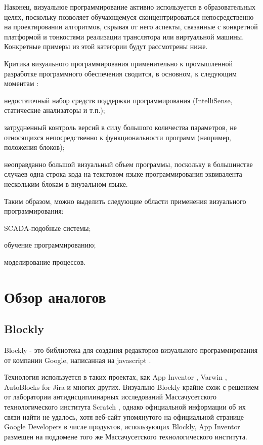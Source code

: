 Наконец, визуальное программирование активно используется в образовательных целях, поскольку позволяет обучающемуся сконцентрироваться непосредственно на проектировании алгоритмов, скрывая от него аспекты, связанные с конкретной платформой и тонкостями реализации транслятора или виртуальной машины. Конкретные примеры из этой категории будут рассмотрены ниже.

Критика визуального программирования применительно к промышленной разработке программного обеспечения сводится, в основном, к следующим моментам \cite{vpl-crit}:

\begin{itemize*}
	\item недостаточный набор средств поддержки программирования (IntelliSense, статические анализаторы и т.п.);
	\item затрудненный контроль версий в силу большого количества параметров, не относящихся непосредственно к функциональности программ (например, положения блоков);
	\item неоправданно большой визуальный объем программы, поскольку в большинстве случаев одна строка кода на текстовом языке программирования эквивалента нескольким блокам в виузальном языке.
\end{itemize*}

Таким образом, можно выделить следующие области применения визуального программирования:

\begin{enumerate*}
	\item SCADA-подобные системы;
	\item обучение программированию;
	\item моделирование процессов.
\end{enumerate*}

\section{Обзор аналогов}
\subsection{Blockly}
Blockly - это библиотека для создания редакторов визуального программирования от компании Google, написанная на javascript \cite{blockly}.

Технология используется в таких проектах, как App Inventor \cite{app-inventor}, Varwin \cite{varwin}, AutoBlocks for Jira \cite{autoblocks} и многих других. Визуально Blockly крайне схож с решением от лаборатории антидисциплинарных исследований Массачусетского технологического института Scratch \cite{scratch}, однако официальной информации об их связи найти не удалось, хотя веб-сайт упомянутого на официальной странице Google Developers \cite{blockly} в числе продуктов, использующих Blockly, App Inventor размещен на поддомене того же Массачусетского технологического института.

